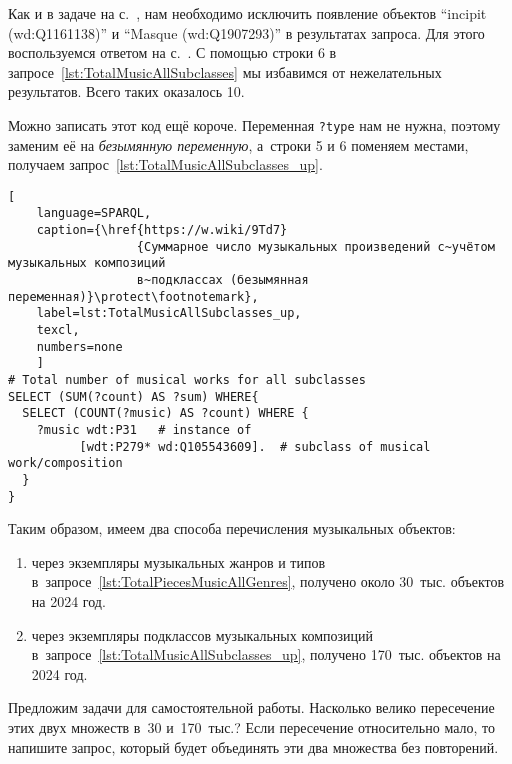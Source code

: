 Как и в задаче на с.~\pageref{question:music_comp}, нам необходимо исключить появление 
объектов ``incipit (wd:Q1161138)'' и ``Masque (wd:Q1907293)'' в результатах запроса. 
Для этого воспользуемся ответом на с.~\pageref{answer:music_in_each_subclas_filter}. 
С помощью строки 6 в запросе~\ref{lst:TotalMusicAllSubclasses} мы избавимся от нежелательных результатов. 
Всего таких оказалось 10. 

Можно записать этот код ещё короче. 
Переменная \lstinline|?type| нам не нужна, 
поэтому заменим её на \emph{безымянную переменную}, 
а~строки 5 и 6 поменяем местами, 
получаем запрос~\ref{lst:TotalMusicAllSubclasses_up}.

\begin{lstlisting}[ 
    language=SPARQL,
    caption={\href{https://w.wiki/9Td7}
                  {Суммарное число музыкальных произведений с~учётом музыкальных композиций 
                  в~подклассах (безымянная переменная)}\protect\footnotemark},
    label=lst:TotalMusicAllSubclasses_up,
    texcl,
    numbers=none
    ]
# Total number of musical works for all subclasses
SELECT (SUM(?count) AS ?sum) WHERE{
  SELECT (COUNT(?music) AS ?count) WHERE {
    ?music wdt:P31   # instance of
          [wdt:P279* wd:Q105543609].  # subclass of musical work/composition
  }       
}
\end{lstlisting}%

Таким образом, имеем два способа перечисления музыкальных объектов: 
\begin{enumerate}
    \item через экземпляры музыкальных жанров и типов в~запросе~\ref{lst:TotalPiecesMusicAllGenres}, 
        получено около 30~тыс. объектов на 2024 год. 

    \item через экземпляры подклассов музыкальных композиций в~запросе~\ref{lst:TotalMusicAllSubclasses_up}, 
        получено 170~тыс. объектов на 2024 год.
\end{enumerate}

Предложим задачи для самостоятельной работы. 
Насколько велико пересечение этих двух множеств в~30 и~170~тыс.? 
Если пересечение относительно мало, то напишите запрос, 
который будет объединять эти два множества без повторений. 


